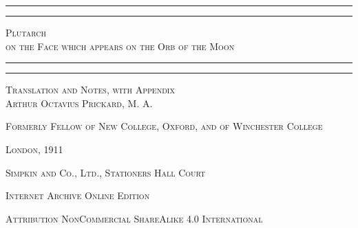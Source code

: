 \documentclass[a4paper, 11pt, oneside, polutonikogreek, english]{article}
\begin{document}
\begin{titlepage} %
	\centering %


	\rule{\textwidth}{1.6pt}\vspace*{-\baselineskip}\vspace*{2pt} %
	\rule{\textwidth}{0.4pt} %
	
	\vspace{1\baselineskip} %
	
	{\scshape\Huge Plutarch \\ on the Face which appears on the Orb of the Moon}
	
	\vspace{1\baselineskip} %

	\rule{\textwidth}{0.4pt}\vspace*{-\baselineskip}\vspace{3.2pt} %
	\rule{\textwidth}{1.6pt} %
	
	\vspace{1\baselineskip} %
	
	
	{\scshape\small Translation and Notes, with Appendix \\ \Large
Arthur Octavius Prickard, \small M. A.}
 
        \vspace{0.5\baselineskip}
		
        {\scshape \small Formerly Fellow of New College, Oxford, and of Winchester College} %

        \vspace*{\fill}    

	\vspace{1\baselineskip}

	{\small\scshape London, 1911}
	
	{\small\scshape{Simpkin and Co., Ltd., Stationers Hall Court}}
	
	\vspace{0.5\baselineskip} %

        {\scshape Internet Archive Online Edition}%
    
	{\scshape\small Attribution NonCommercial ShareAlike 4.0 International } %
\end{titlepage}
\end{document}
